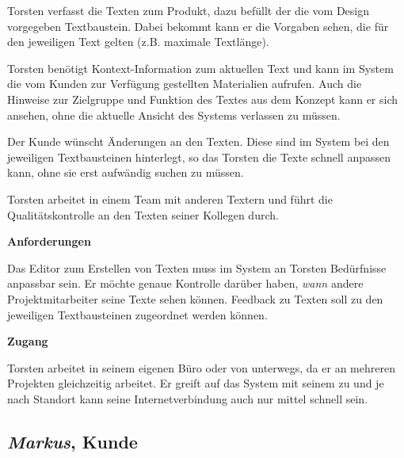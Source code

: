 \begin{multicols}{2}
Torsten verfasst die Texten zum Produkt, dazu befüllt der die vom Design vorgegeben Textbaustein. Dabei bekommt kann er die Vorgaben sehen, die für den jeweiligen Text gelten (z.B. maximale Textlänge). 

Torsten benötigt Kontext-Information zum aktuellen Text und kann im System die vom Kunden zur Verfügung gestellten Materialien aufrufen. Auch die Hinweise zur Zielgruppe und Funktion des Textes aus dem Konzept kann er sich ansehen, ohne die aktuelle Ansicht des Systems verlassen zu müssen.

Der Kunde wünscht Änderungen an den Texten. Diese sind im System bei den jeweiligen Textbausteinen hinterlegt, so das Torsten die Texte schnell anpassen kann, ohne sie erst aufwändig suchen zu müssen.

Torsten arbeitet in einem Team mit anderen Textern und führt die Qualitätskontrolle an den Texten seiner Kollegen durch.

\textbf{Anforderungen}

Das Editor zum Erstellen von Texten muss im System an Torsten Bedürfnisse anpassbar sein. Er möchte genaue Kontrolle darüber haben, \emph{wann} andere Projektmitarbeiter seine Texte sehen können. Feedback zu Texten soll zu den jeweiligen Textbausteinen zugeordnet werden können.

\textbf{Zugang}

Torsten arbeitet in seinem eigenen Büro oder von unterwegs, da er an mehreren Projekten gleichzeitig arbeitet. Er greift auf das System mit seinem  zu und je nach Standort kann seine Internetverbindung auch nur mittel schnell sein.

\end{multicols}

\pagebreak

\subsection{\emph{Markus}, Kunde}\label{p:markus}

